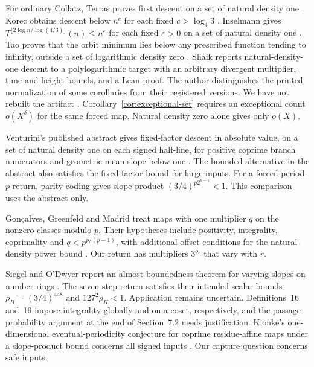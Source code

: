 For ordinary Collatz, Terras proves first descent on a set of natural
density one \cite{terras-1976}. Korec obtains descent below $n^c$ for
each fixed $c>\log_4 3$ \cite[Theorem~1]{korec-1994}. Inselmann gives
$T^{\lfloor 2\log n/\log(4/3)\rfloor}(n)\le n^\varepsilon$ for each
fixed $\varepsilon>0$ on a set of natural density one
\cite[Corollary~1.4, arXiv v3]{inselmann-2024}. Tao proves that the
orbit minimum lies below any prescribed function tending to infinity,
outside a set of logarithmic density zero \cite[Theorem~1.3]{tao}.
Shaik reports natural-density-one descent to a polylogarithmic target
with an arbitrary divergent multiplier, time and height bounds, and a
Lean proof. The author distinguishes the printed normalization of some
corollaries from their registered versions. We have not rebuilt the
artifact \cite[Theorem~1.1 and Section~8]{shaik-2026}.
Corollary~\ref{cor:exceptional-set} requires an exceptional count
$o(X^\delta)$ for the same forced map. Natural density zero alone
gives only $o(X)$.

Venturini's published abstract gives fixed-factor descent in absolute
value, on a set of natural density one on each signed half-line, for
positive coprime branch numerators and geometric mean slope below one
\cite{venturini-1997}. The bounded alternative in the abstract also
satisfies the fixed-factor bound for large inputs. For a forced
period-$p$ return, parity coding gives slope product
$(3/4)^{p2^{p-1}}<1$. This comparison uses the abstract only.

Gon\c{c}alves, Greenfeld and Madrid treat maps with one multiplier $q$
on the nonzero classes modulo $p$. Their hypotheses include positivity,
integrality, coprimality and $q<p^{p/(p-1)}$, with additional offset
conditions for the natural-density power bound
\cite[Definition~1.2 and Theorems~1.3 and~1.8, arXiv v2]{goncalves-greenfeld-madrid-2025}.
Our return has multipliers $3^{o_r}$ that vary with $r$.

Siegel and O'Dwyer report an almost-boundedness theorem for varying
slopes on number rings \cite[Theorem~5 and Definitions~16, 19, arXiv v1]{siegel-odwyer-2026}.
The seven-step return satisfies their intended scalar bounds
$\rho_H=(3/4)^{448}$ and $127^2\rho_H<1$. Application remains uncertain.
Definitions~16 and~19 impose integrality globally and on a coset,
respectively, and the passage-probability argument at the end of
Section~7.2 needs justification. Kionke's one-dimensional
eventual-periodicity conjecture for coprime residue-affine maps under
a slope-product bound concerns all signed inputs
\cite[Section~1]{kionke-2017}. Our capture question concerns safe inputs.

